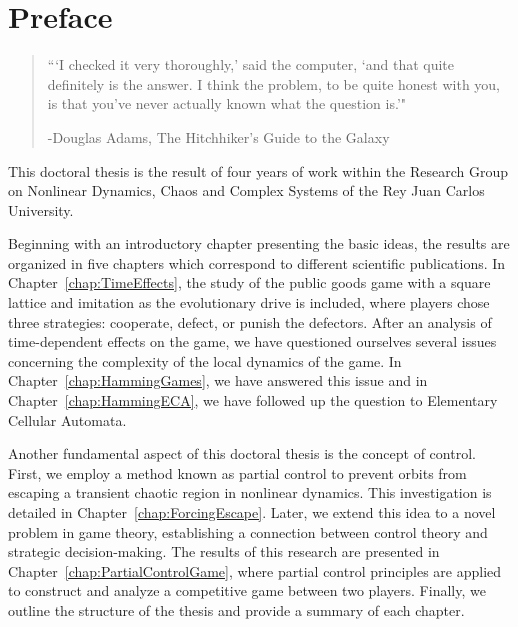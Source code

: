 \chapter*{Preface}


\begin{quotation}

\begin{flushright}
\begin{minipage}[t][5cm][b]{0.5\textwidth}
{ ```I checked it very thoroughly,' said the computer, `and that quite definitely is the answer. I think the
problem, to be quite honest with you, is that you've never actually known what the question is.'"}

\bigskip

-{\small  Douglas Adams, The Hitchhiker’s Guide to the Galaxy}
\end{minipage}
\end{flushright}

\vspace{0.5cm}
\end{quotation}


This doctoral thesis is the result of four years of work within the Research Group on Nonlinear Dynamics, Chaos and Complex Systems of the Rey Juan Carlos University.

Beginning with an introductory chapter presenting the basic ideas, the results are organized in five chapters which correspond to different scientific publications. In Chapter~\ref{chap:TimeEffects}, the study of the public goods game with a square lattice and imitation as the evolutionary drive is included, where players chose three strategies: cooperate, defect, or punish the defectors. After an analysis of time-dependent effects on the game, we have questioned ourselves several issues concerning the complexity of the local dynamics of the game. In Chapter~\ref{chap:HammingGames}, we have answered this issue and in Chapter~\ref{chap:HammingECA}, we have followed up the question to Elementary Cellular Automata. 

Another fundamental aspect of this doctoral thesis is the concept of control. First, we employ a method known as partial control to prevent orbits from escaping a transient chaotic region in nonlinear dynamics. This investigation is detailed in Chapter~\ref{chap:ForcingEscape}. Later, we extend this idea to a novel problem in game theory, establishing a connection between control theory and strategic decision-making. The results of this research are presented in Chapter~\ref{chap:PartialControlGame}, where partial control principles are applied to construct and analyze a competitive game between two players. Finally, we outline the structure of the thesis and provide a summary of each chapter.




